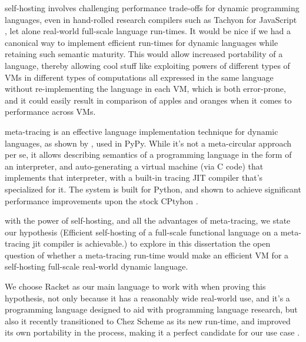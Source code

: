     \begin{paragraph-here}%
        self-hosting involves challenging performance trade-offs for dynamic programming languages, even in hand-rolled research compilers such as Tachyon for JavaScript \cite{self-hosted-tachyon}, let alone real-world full-scale language run-times. It would be nice if we had a canonical way to implement efficient run-times for dynamic languages while retaining such semantic maturity. This would allow increased portability of a language, thereby allowing cool stuff like exploiting powers of different types of VMs in different types of computations all expressed in the same language without re-implementing the language in each VM, which is both error-prone, and it could easily result in comparison of apples and oranges when it comes to performance across VMs.
    \end{paragraph-here}

    \begin{paragraph-here}%
        meta-tracing is an effective language implementation technique for dynamic languages, as shown by \cite{bolzPhDThesis}, used in PyPy. While it's not a meta-circular approach per se, it allows describing semantics of a programming language in the form of an interpreter, and auto-generating a virtual machine (via C code) that implements that interpreter, with a built-in tracing JIT compiler that's specialized for it. The system is built for Python, and shown to achieve significant performance improvements upon the stock CPtyhon \cite{pypy-main}.
    \end{paragraph-here}

    \begin{paragraph-here}%
        with the power of self-hosting, and all the advantages of meta-tracing, we state our hypothesis (Efficient self-hosting of a full-scale functional language on a meta-tracing \gls{jit} compiler is achievable.) to explore in this dissertation the open question of whether a meta-tracing run-time would make an efficient VM for a self-hosting full-scale real-world dynamic language.
    \end{paragraph-here}

    \begin{paragraph-here}%
        We choose Racket as our main language to work with when proving this hypothesis, not only because it has a reasonably wide real-world use, and it's a programming language designed to aid with programming language research, but also it recently transitioned to Chez Scheme as its new run-time, and improved its own portability in the process, making it a perfect candidate for our use case \cite{icfp2019}.
    \end{paragraph-here}

